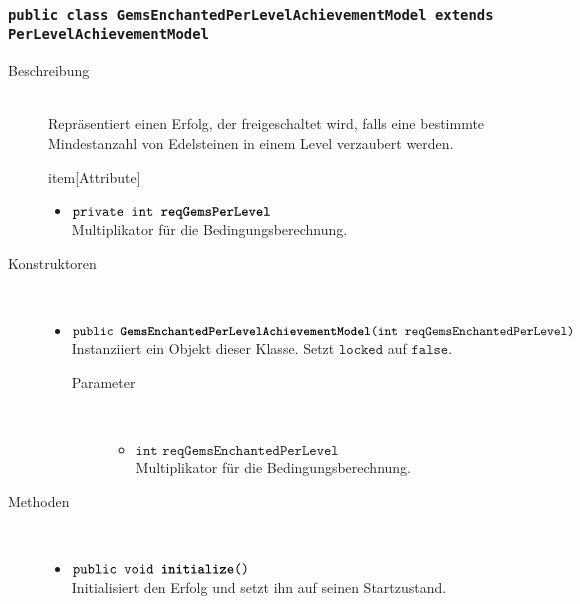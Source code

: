 \subsubsection{\normalfont \texttt{public class \textbf{GemsEnchantedPerLevelAchievementModel} extends PerLevelAchievementModel}}

\begin{description}
\item[Beschreibung] \hfill \\ Repräsentiert einen Erfolg, der freigeschaltet wird, falls eine bestimmte Mindestanzahl von Edelsteinen in einem Level verzaubert werden.
	
item[Attribute] \hfill \\
	\vspace{-.8cm}
	\begin{itemize}
		\item $\texttt{private int \textbf{reqGemsPerLevel}}$ \\ Multiplikator für die Bedingungsberechnung.
	\end{itemize}	
	
\item[Konstruktoren] \hfill \\
	\vspace{-.8cm}
	\begin{itemize}
		\item $\texttt{public \textbf{GemsEnchantedPerLevelAchievementModel}(int reqGemsEnchantedPerLevel)}$ \\ Instanziiert ein Objekt dieser Klasse. Setzt $\texttt{locked}$ auf $\texttt{false}$.
		\begin{description}
			\item[Parameter] \hfill \\
			\vspace{-.8cm}
			\begin{itemize}
				\item $\texttt{int reqGemsEnchantedPerLevel}$ \\ Multiplikator für die Bedingungsberechnung.
			\end{itemize}
		\end{description}
	\end{itemize}
	
\item[Methoden] \hfill \\
	\vspace{-.8cm}
	\begin{itemize}
				\item $\texttt{public void \textbf{initialize}()}$ \\ Initialisiert den Erfolg und setzt ihn auf seinen Startzustand.
		

\end{itemize}
\end{description}
